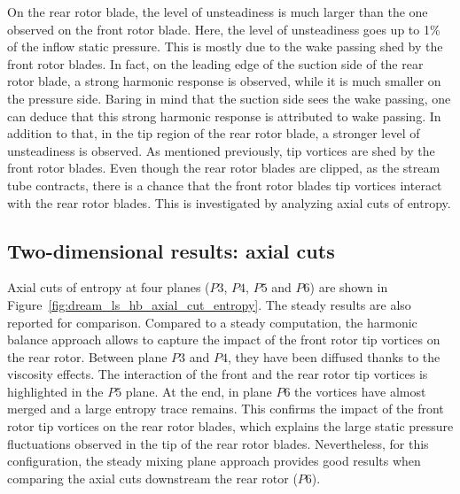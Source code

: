 On the rear rotor blade, the level
of unsteadiness is much larger than the one observed on
the front rotor blade. 
Here, the level of unsteadiness
goes up to 1\% of the inflow static pressure.
This is mostly due to the wake passing
shed by the front rotor blades. In fact, on the leading
edge of the suction side of the rear rotor blade, 
a strong harmonic response is observed, while it is 
much smaller on the pressure side. Baring in mind that 
the suction side sees the wake passing, one can deduce
that this strong harmonic response is attributed to wake passing.
In addition to that, in the tip region of the rear rotor blade, 
a stronger level of unsteadiness is observed. As mentioned
previously, tip vortices are shed by the front rotor blades.
Even though the rear rotor blades are clipped, as 
the stream tube contracts, there is a chance that
the front rotor blades tip vortices interact with the 
rear rotor blades. This is investigated by analyzing
axial cuts of entropy.

\subsection{Two-dimensional results: axial cuts}
\label{sub:dream_ls_hb_axial_cuts}

Axial cuts of entropy at four planes ($P3$, $P4$, $P5$ and $P6$)
are shown in Figure~\ref{fig:dream_ls_hb_axial_cut_entropy}.
The steady results are also reported for comparison.
Compared to a steady computation, the harmonic balance
approach allows to capture the impact of the front rotor
tip vortices on the rear rotor. Between plane $P3$
and $P4$, they have been diffused thanks to the viscosity effects.
The interaction of the front and the rear rotor tip vortices
is highlighted in the $P5$ plane. At the end, in plane $P6$
the vortices have almost merged and a large entropy
trace remains. This confirms the impact
of the front rotor tip vortices on the
rear rotor blades, which explains the large static pressure
fluctuations observed in the tip of the rear 
rotor blades. Nevertheless, for this
configuration, the steady mixing plane approach 
provides good results when comparing the axial
cuts downstream the rear rotor ($P6$).

